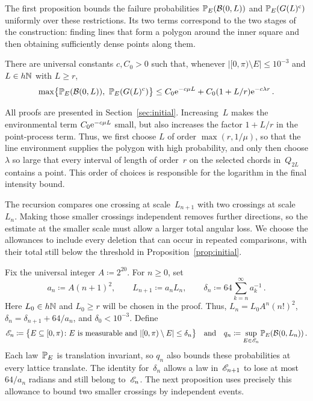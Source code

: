 \documentclass[11pt,letterpaper]{article}
\begin{document}
The first proposition bounds the failure probabilities $\P_E(\cB(0,L))$ and $\P_E(G(L)^\c)$ uniformly over these restrictions. Its two terms correspond to the two stages of the construction: finding lines that form a polygon around the inner square and then obtaining sufficiently dense points along them.

\begin{proposition}
\label{prop:initial}
There are universal constants $c,C_0>0$ such that, whenever $\lvert[0,\pi)\setminus E\rvert\le10^{-3}$ and $L\in h\N$ with $L\ge r$,
\begin{equation*}
  \max\bigl\{\P_E(\cB(0,L)),\ \P_E(G(L)^\c)\bigr\}\le C_0\e^{-c\mu L}+C_0(1+L/r)\e^{-c\lambda r}\,.
\end{equation*}
\end{proposition}
All proofs are presented in Section~\ref{sec:initial}. 
Increasing~$L$ makes the environmental term $C_0\e^{-c\mu L}$ small, but also increases the factor $1+L/r$ in the point-process term. Thus, we first choose $L$ of order $\max(r,1/\mu)$, so that the line environment supplies the polygon with high probability, and only then choose $\lambda$ so large that every interval of length of order~$r$ on the selected chords in~$Q_{2L}$ contains a point. This order of choices is responsible for the logarithm in the final intensity bound.

The recursion compares one crossing at scale~$L_{n+1}$ with two crossings at scale~$L_n$. Making those smaller crossings independent removes further directions, so the estimate at the smaller scale must allow a larger total angular loss. We choose the allowances to include every deletion that can occur in repeated comparisons, with their total still below the threshold in Proposition~\ref{prop:initial}.

Fix the universal integer $A\coloneqq2^{20}$. For $n\ge0$, set
\begin{equation}\label{eq:scales-angular-loss}
  a_n\coloneqq A(n+1)^2,\qquad L_{n+1}\coloneqq a_nL_n,\qquad\delta_n\coloneqq64\sum_{k=n}^\infty a_k^{-1}\,.
\end{equation}
Here $L_0\in h\N$ and $L_0\ge r$ will be chosen in the proof. Thus, $L_n=L_0A^n(n!)^2$, $\delta_n=\delta_{n+1}+64/a_n$, and $\delta_0<10^{-3}$. Define
\begin{equation}\label{eq:uniform-crossing-probability}
  \begin{aligned}
    \cE_n\coloneqq\bigl\{E\subseteq[0,\pi)\colon E\text{ is measurable and }\lvert[0,\pi)\setminus E\rvert\le\delta_n\bigr\}\quad\text{and}\quad
    q_n\coloneqq\sup_{E\in\cE_n}\P_E(\cB(0,L_n))\,.
  \end{aligned}
\end{equation}
Each law~$\P_E$ is translation invariant, so $q_n$ also bounds these probabilities at every lattice translate. The identity for~$\delta_n$ allows a law in~$\cE_{n+1}$ to lose at most $64/a_n$ radians and still belong to~$\cE_n$. The next proposition uses precisely this allowance to bound two smaller crossings by independent events.
\end{document}
